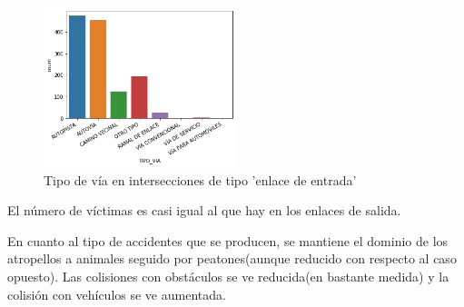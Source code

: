 \begin{figure}[H]
\centering
\includegraphics[width=0.5\textwidth]{imagenes/tipo_via_caso2.png}
\caption{Tipo de vía en intersecciones de tipo 'enlace de entrada'}
\end{figure}

El número de víctimas es casi igual al que hay en los enlaces de salida.

En cuanto al tipo de accidentes que se producen, se mantiene el dominio de los atropellos a animales seguido por peatones(aunque reducido con respecto al caso opuesto). Las colisiones con obstáculos se ve reducida(en bastante medida) y la colisión con vehículos se ve aumentada.

